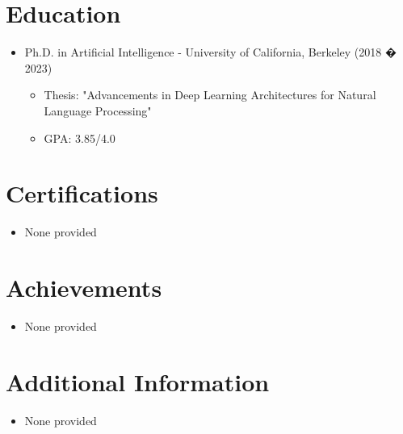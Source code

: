 \section{Education}
\begin{itemize}[leftmargin=0.15in]
    \item Ph.D. in Artificial Intelligence - University of California, Berkeley (2018 � 2023)
        \begin{itemize}[leftmargin=0.15in]
            \item Thesis: "Advancements in Deep Learning Architectures for Natural Language Processing"
            \item GPA: 3.85/4.0
        \end{itemize}
\end{itemize}

\section{Certifications}
\begin{itemize}[leftmargin=0.15in]
    \item None provided
\end{itemize}

\section{Achievements}
\begin{itemize}[leftmargin=0.15in]
    \item None provided
\end{itemize}

\section{Additional Information}
\begin{itemize}[leftmargin=0.15in]
    \item None provided
\end{itemize}